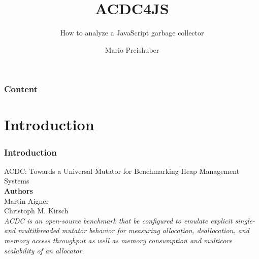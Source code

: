\documentclass{beamer}
\title{ACDC4JS}
\subtitle{How to analyze a JavaScript garbage collector}
\author{Mario Preishuber}
\institute[2013]{University of Salzburg}
\begin{document}
	
	\begin{frame}
		\titlepage
	\end{frame}

	\begin{frame}
		\frametitle{Content}
		\setcounter{tocdepth}{1}
		\tableofcontents
	\end{frame}
	
	
	\section{Introduction}	
	\begin{frame}
		\frametitle{Introduction}
		ACDC: Towards a Universal Mutator for
		Benchmarking Heap Management Systems \\
		\bigskip
		\textbf{Authors} \\
		Martin Aigner \\ 
		Christoph M. Kirsch \\
		\bigskip
		\textit{ACDC is an open-source benchmark that be configured to emulate explicit single- and multithreaded mutator behavior 
		for measuring allocation, deallocation, and memory access throughput as well as memory consumption and multicore 
		scalability of an allocator.}
		
	\end{frame}
	
\end{document}
